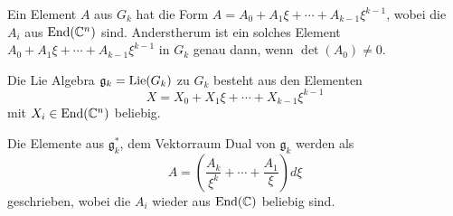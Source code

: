 Ein Element $A$ aus $G_k$ hat die Form $A=A_0+A_1\xi+\cdots+A_{k-1}\xi^{k-1}$,
wobei die $A_i$ aus $\operatorname{End}(\mathbb{C}^n)$ sind. Anderstherum ist ein solches Element
$A_0+A_1\xi+\cdots+A_{k-1}\xi^{k-1}$ in $G_k$ genau dann, wenn $\det(A_0)\neq0$.
\begin{comment}
Zu Zeigen: $\det(\sum^{k-1}_{i=0}A_{i}\xi^{i})\neq 0$ $\Leftrightarrow$
$\det(A_0)\neq0$.\\
\textbf{Denn} $\det(\sum^{k-1}_{i=0}A_{i}\xi^{i})
=\overset{\text{\color{red}?}}\dots=\det(A_0)$.
\end{comment}
Die Lie Algebra $\mathfrak g_k=\operatorname{Lie}(G_k)$ zu $G_k$ besteht aus den Elementen
\[
X=X_0+X_1\xi+\cdots+X_{k-1}\xi^{k-1}
\]
mit $X_i\in\operatorname{End}(\mathbb{C}^n)$ beliebig.
\begin{comment}
Dazu: \TODO
\end{comment}
Die Elemente aus $\mathfrak g_k^*$, dem Vektorraum Dual von $\mathfrak g_k$
werden als
\[
A=\left(\frac{A_{k}}{\xi^{k}}+\cdots+\frac{A_{1}}{\xi}\right)d\xi
\]
geschrieben, wobei die $A_i$ wieder aus $\operatorname{End}(\mathbb{C})$ beliebig sind. 
\begin{comment}
\ccite[p. 22]{thboalch}
Die Paarung zwischen $\mathfrak g_k^*$ und $\mathfrak g_k$ ist gegeben durch
\[
<A,X>=\Res_0(\Tr(AX))=\sum^{k}_{i=1}\Tr(A_iX_{i-1})
\]
Wobei $\Res_0$ die Residuen Abbildung ist, welche den Koeffizient vor
$d\xi/\xi$ ausgibt.
\textbf{Observe that the product $AX$ is a well defined element of $\mathfrak
g_k^∗$, where $A\in\mathfrak g_k^*$ and $X\in\mathfrak g_k$.}
Ähnlich ist das Produkt $XA$ wohldefiniert in $\mathfrak g_k^∗$. Damit ist
$\mathfrak g_k^*$ ein Bimodul über $\mathfrak g_k$.
\end{comment}

